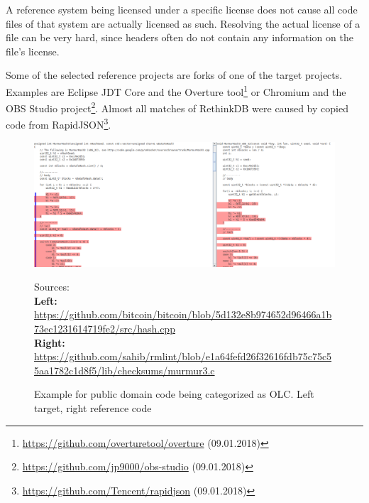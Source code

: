 A reference system being licensed under a specific license does not cause all code files of that system are actually licensed as such.
Resolving the actual license of a file can be very hard, since headers often do not contain any information on the file's license.

Some of the selected reference projects are forks of one of the target projects.
Examples are Eclipse JDT Core and the Overture tool\footnote{\href{https://github.com/overturetool/overture}{https://github.com/overturetool/overture} (09.01.2018)} or Chromium and the OBS Studio project\footnote{\href{https://github.com/jp9000/obs-studio}{https://github.com/jp9000/obs-studio} (09.01.2018)}.
Almost all matches of RethinkDB were caused by copied code from RapidJSON\footnote{\href{https://github.com/Tencent/rapidjson}{https://github.com/Tencent/rapidjson} (09.01.2018)}.

\begin{figure}[h!]
	\centering
	\includegraphics[width=\linewidth]{figures/olc_public_domain.png}
	\caption{Example for public domain code being categorized as OLC. Left target, right reference code}
	{
		\begin{flushleft}
			\tiny Sources:\\
			\textbf{Left:}
			\href{https://github.com/bitcoin/bitcoin/blob/5d132e8b974652d96466a1b73ec1231614719fe2/src/hash.cpp}
			{https://github.com/bitcoin/bitcoin/blob/5d132e8b974652d96466a1b73ec1231614719fe2/src/hash.cpp}\\
			\textbf{Right:}
			\href{https://github.com/sahib/rmlint/blob/e1a64fefd26f32616fdb75c75c55aa1782c1d8f5/lib/checksums/murmur3.c}
			{https://github.com/sahib/rmlint/blob/e1a64fefd26f32616fdb75c75c55aa1782c1d8f5/lib/checksums/murmur3.c}
		\end{flushleft}
	}

	\label{fig:olc_public_domain}
\end{figure}

